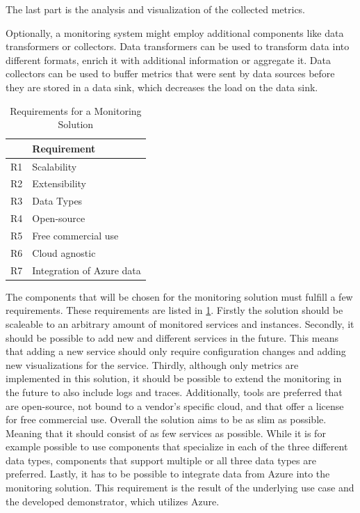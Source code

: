 The last part is the analysis and visualization of the collected metrics.

Optionally, a monitoring system might employ additional components like data transformers or collectors.
Data transformers can be used to transform data into different formats, enrich it with additional information
or aggregate it.
Data collectors can be used to buffer metrics that were sent by data sources before they are stored in a data sink,
which decreases the load on the data sink.

\begin{table}[]
\begin{tabular}{l|l}
	& Requirement       			\\
\hline
R1 	& Scalability 					\\
R2 	& Extensibility       			\\
R3 	& Data Types 					\\
R4 	& Open-source       			\\
R5 	& Free commercial use  			\\
R6 	& Cloud agnostic       			\\
R7 	& Integration of Azure data
\end{tabular}
\caption{Requirements for a Monitoring Solution}
\label{tab:requirements}
\end{table}

The components that will be chosen for the monitoring solution must fulfill a few requirements.
These requirements are listed in \ref{tab:requirements}.
Firstly the solution should be scaleable to an arbitrary amount of monitored services and instances.
Secondly, it should be possible to add new and different services in the future.
This means that adding a new service should only require configuration changes and adding new visualizations for the service.
Thirdly, although only metrics are implemented in this solution, it should be possible to extend
the monitoring in the future to also include logs and traces.
Additionally, tools are preferred that are open-source, not bound to a vendor's specific cloud,
and that offer a license for free commercial use.
Overall the solution aims to be as slim as possible. Meaning that it should consist of as few services as possible.
While it is for example possible to use components that specialize in each of the three different data types,
components that support multiple or all three data types are preferred.
Lastly, it has to be possible to integrate data from Azure into the monitoring solution.
This requirement is the result of the underlying use case and the developed demonstrator,
which utilizes Azure.

